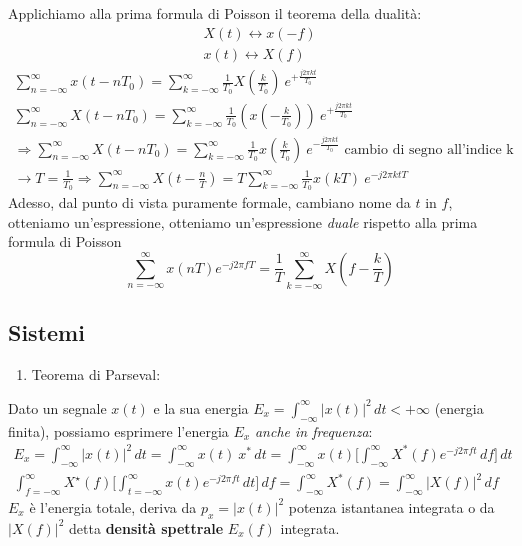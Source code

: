 \documentclass[
]{article}
\providecommand{\tightlist}{%
  \setlength{\itemsep}{0pt}\setlength{\parskip}{0pt}}
\begin{document}
\begin{enumerate}
  Applichiamo alla prima formula di Poisson il teorema della dualità:
  \begin{gather*}
  X(t) \longleftrightarrow x(-f) \\
  x(t) \longleftrightarrow X(f)
  \end{gather*} \begin{gather*}
  \sum_{n=-\infty}^{\infty}x(t-nT_0) = \sum_{k=-\infty}^{\infty} \frac{1}{T_0} X(\frac{k}{T_0})\ e^{+\frac{j2\pi kt}{T_0}} \\
  \sum_{n=-\infty}^{\infty}X(t-nT_0) = \sum_{k=-\infty}^{\infty} \frac{1}{T_0}(x(-\frac{k}{T_0}))\ e^{+\frac{j2\pi kt}{T_0}} \\
  \Rightarrow \sum_{n=-\infty}^{\infty}X(t-nT_0) = \sum_{k=-\infty}^{\infty} \frac{1}{T_0} x(\frac{k}{T_0})\ e^{-\frac{j2\pi kt}{T_0}} \text{ cambio di segno all'indice k} \\
  \to T = \frac{1}{T_0} \Rightarrow \sum_{n=-\infty}^{\infty}X(t-\frac{n}{T}) = T\sum_{k=-\infty}^{\infty} \frac{1}{T_0} x(kT)\ e^{-j2\pi ktT}
  \end{gather*} Adesso, dal punto di vista puramente formale, cambiano
  nome da \(t\) in \(f\), otteniamo un'espressione, otteniamo
  un'espressione \emph{duale} rispetto alla prima formula di Poisson \[
  \sum_{n=-\infty}^{\infty}x(nT)e^{-j2\pi fT} = \frac{1}{T}\sum_{k=-\infty}^{\infty}X(f-\frac{k}{T})
  \]
\end{enumerate}

\subsection{Sistemi}\label{sistemi}

\begin{enumerate}
\def\labelenumi{\arabic{enumi}.}
\setcounter{enumi}{25}
\tightlist
\item
  Teorema di Parseval:
\end{enumerate}

Dato un segnale \(x(t)\) e la sua energia
\(E_{x}=\int_{-\infty}^{\infty} |x(t)|^2 \,dt < +\infty\) (energia
finita), possiamo esprimere l'energia \(E_x\) \emph{anche in frequenza}:
\begin{gather*}
E_{x}=\int_{-\infty}^{\infty} |x(t)|^2 \,dt = \int_{-\infty}^{\infty} x(t) \ x^{\ast} \,dt = \int_{-\infty}^{\infty} x(t) \Big[ \int_{-\infty}^{\infty} X^{*}(f) e^{-j2\pi ft} \,df \Big] \,dt \\
\int_{f=-\infty}^{\infty} X^{\star}(f) \Big [\int_{t=-\infty}^{\infty} x(t) e^{-j2\pi ft} \,dt\Big ] \,df = \int_{-\infty}^{\infty} X^{*}(f) = \int_{-\infty}^{\infty} |X(f)|^{2} \,df
\end{gather*} \(E_x\) è l'energia totale, deriva da \(p_x = |x(t)|^2\)
potenza istantanea integrata o da \(|X(f)|^2\) detta \textbf{densità
spettrale} \(E_x(f)\) integrata.
\end{document}
